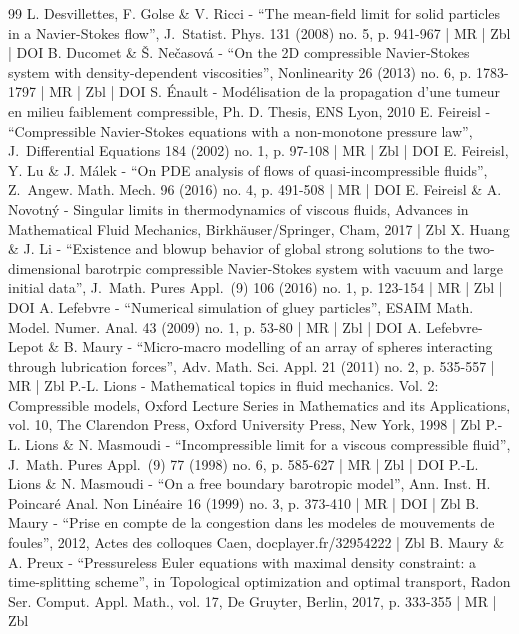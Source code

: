\documentclass[10pt]{amsart}
\newcommand{\<}{\bigl\langle}
\renewcommand{\>}{\bigr\rangle}
\theoremstyle{definition}
\theoremstyle{remark}
\begin{document}
\begin{thebibliography}{99}
L. Desvillettes, F. Golse \& V. Ricci - “The mean-field limit for solid particles in a Navier-Stokes flow”, J. Statist. Phys. 131 (2008) no. 5, p. 941-967 | MR | Zbl | DOI
B. Ducomet \& Š. Nečasová - “On the 2D compressible Navier-Stokes system with density-dependent viscosities”, Nonlinearity 26 (2013) no. 6, p. 1783-1797 | MR | Zbl | DOI
S. Énault - Modélisation de la propagation d’une tumeur en milieu faiblement compressible, Ph. D. Thesis, ENS Lyon, 2010
E. Feireisl - “Compressible Navier-Stokes equations with a non-monotone pressure law”, J. Differential Equations 184 (2002) no. 1, p. 97-108 | MR | Zbl | DOI
E. Feireisl, Y. Lu \& J. Málek - “On PDE analysis of flows of quasi-incompressible fluids”, Z. Angew. Math. Mech. 96 (2016) no. 4, p. 491-508 | MR | DOI
E. Feireisl \& A. Novotný - Singular limits in thermodynamics of viscous fluids, Advances in Mathematical Fluid Mechanics, Birkhäuser/Springer, Cham, 2017 | Zbl
X. Huang \& J. Li - “Existence and blowup behavior of global strong solutions to the two-dimensional barotrpic compressible Navier-Stokes system with vacuum and large initial data”, J. Math. Pures Appl. (9) 106 (2016) no. 1, p. 123-154 | MR | Zbl | DOI
A. Lefebvre - “Numerical simulation of gluey particles”, ESAIM Math. Model. Numer. Anal. 43 (2009) no. 1, p. 53-80 | MR | Zbl | DOI
A. Lefebvre-Lepot \& B. Maury - “Micro-macro modelling of an array of spheres interacting through lubrication forces”, Adv. Math. Sci. Appl. 21 (2011) no. 2, p. 535-557 | MR | Zbl
P.-L. Lions - Mathematical topics in fluid mechanics. Vol. 2: Compressible models, Oxford Lecture Series in Mathematics and its Applications, vol. 10, The Clarendon Press, Oxford University Press, New York, 1998 | Zbl
P.-L. Lions \& N. Masmoudi - “Incompressible limit for a viscous compressible fluid”, J. Math. Pures Appl. (9) 77 (1998) no. 6, p. 585-627 | MR | Zbl | DOI
P.-L. Lions \& N. Masmoudi - “On a free boundary barotropic model”, Ann. Inst. H. Poincaré Anal. Non Linéaire 16 (1999) no. 3, p. 373-410 | MR | DOI | Zbl
B. Maury - “Prise en compte de la congestion dans les modeles de mouvements de foules”, 2012, Actes des colloques Caen, docplayer.fr/32954222 | Zbl
B. Maury \& A. Preux - “Pressureless Euler equations with maximal density constraint: a time-splitting scheme”, in Topological optimization and optimal transport, Radon Ser. Comput. Appl. Math., vol. 17, De Gruyter, Berlin, 2017, p. 333-355 | MR | Zbl

\end{thebibliography}
\end{document}
